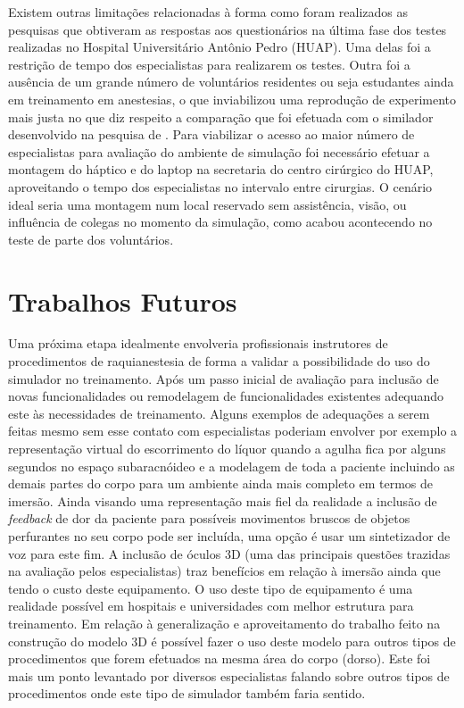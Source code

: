 Existem outras limitações relacionadas à forma como foram realizados as pesquisas que obtiveram as respostas aos questionários na última fase dos testes realizadas no Hospital Universitário Antônio Pedro (HUAP). Uma delas foi a restrição de tempo dos especialistas para realizarem os testes. Outra foi a ausência de um grande número de voluntários residentes ou seja estudantes ainda em treinamento em anestesias, o que inviabilizou uma reprodução de experimento mais justa no que diz respeito a comparação que foi efetuada com o similador desenvolvido na pesquisa de \textcite{Farber2008}. Para viabilizar o acesso ao maior número de especialistas para avaliação do ambiente de simulação foi necessário efetuar a montagem do háptico e do laptop na secretaria do centro cirúrgico do HUAP, aproveitando o tempo dos especialistas no intervalo entre cirurgias. O cenário ideal seria uma montagem num local reservado sem assistência, visão, ou influência de colegas no momento da simulação, como acabou acontecendo no teste de parte dos voluntários. 

\section{Trabalhos Futuros}
\label{sec:trabFuturo}

Uma próxima etapa idealmente envolveria profissionais instrutores de procedimentos de raquianestesia de forma a validar a possibilidade do uso do simulador no treinamento. Após um passo inicial de avaliação para inclusão de novas funcionalidades ou remodelagem de funcionalidades existentes adequando este às necessidades de treinamento. Alguns exemplos de adequações a serem feitas mesmo sem esse contato com especialistas poderiam envolver por exemplo a representação virtual do escorrimento do líquor quando a agulha fica por alguns segundos no espaço subaracnóideo e a modelagem de toda a paciente incluindo as demais partes do corpo para um ambiente ainda mais completo em termos de imersão. Ainda visando uma representação mais fiel da realidade a inclusão de \textit{feedback} de dor da paciente para possíveis movimentos bruscos de objetos perfurantes no seu corpo pode ser incluída, uma opção é usar um sintetizador de voz para este fim. A inclusão de óculos 3D (uma das principais questões trazidas na avaliação pelos especialistas) traz benefícios em relação à imersão ainda que tendo o custo deste equipamento. O uso deste tipo de equipamento é uma realidade possível em hospitais e universidades com melhor estrutura para treinamento.
Em relação à generalização e aproveitamento do trabalho feito na construção do modelo 3D é possível fazer o uso deste modelo para outros tipos de procedimentos que forem efetuados na mesma área do corpo (dorso). Este foi mais um ponto levantado por diversos especialistas falando sobre outros tipos de procedimentos onde este tipo de simulador também faria sentido.

